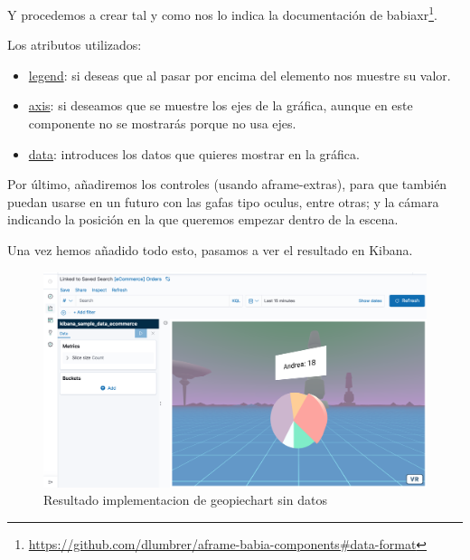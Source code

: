 \documentclass[a4paper, 12pt]{book}
\begin{document}


Y procedemos a crear tal y como nos lo indica la documentación de babiaxr\footnote{\url{https://github.com/dlumbrer/aframe-babia-components#data-format}}.



Los atributos utilizados:
\begin{itemize}
    \item \underline{legend}: si deseas que al pasar por encima del elemento nos muestre su valor.
    \item \underline{axis}: si deseamos que se muestre los ejes de la gráfica, aunque en este componente no se mostrarás porque no usa ejes.
    \item \underline{data}: introduces los datos que quieres mostrar en la gráfica.
\end{itemize}

Por último, añadiremos los controles (usando aframe-extras), para que también puedan usarse en un futuro con las gafas tipo oculus, entre otras; y la cámara indicando la posición en la que queremos empezar dentro de la escena.



Una vez hemos añadido todo esto, pasamos a ver el resultado en Kibana.

\begin{figure}[H]
  \centering
  \includegraphics[width=12cm, keepaspectratio]{img/development/pie-sin-data.png}
  \caption{Resultado implementacion de geopiechart sin datos}
  \label{fig:piesindata}
\end{figure}



\end{document}
